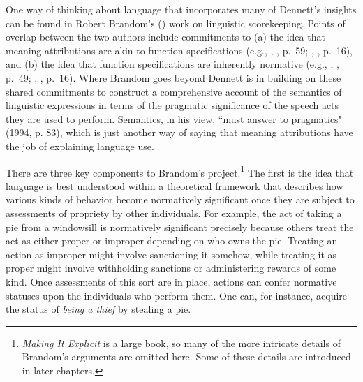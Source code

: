 One way of thinking about language that incorporates many of Dennett's insights can be found in Robert Brandom's (\citeyear{Brandom:1994}) work on linguistic scorekeeping. Points of overlap between the two authors include commitments to (a) the idea that meaning attributions are akin to function specifications (e.g., \citeauthor{Dennett:1987}, \citeyear{Dennett:1987}, p.~59; \citeauthor{Brandom:1994}, \citeyear{Brandom:1994}, p.~16), and (b) the idea that function specifications are inherently normative (e.g., \citeauthor{Dennett:1987}, \citeyear{Dennett:1987}, p.~49; \citeauthor{Brandom:1994}, \citeyear{Brandom:1994}, p.~16). Where Brandom goes beyond Dennett is in building on these shared commitments to construct a comprehensive account of the semantics of linguistic expressions in terms of the pragmatic significance of the speech acts they are used to perform. Semantics, in his view, ``must answer to pragmatics" (1994, p. 83), which is just another way of saying that meaning attributions have the job of explaining language use. 

There are three key components to Brandom's project.\footnote{\textit{Making It Explicit} is a large book, so many of the more intricate details of Brandom's arguments are omitted here. Some of these details are introduced in later chapters.} The first is the idea that language is best understood within a theoretical framework that describes how various kinds of behavior become normatively significant once they are subject to assessments of propriety by other individuals. For example, the act of taking a pie from a windowsill is normatively significant precisely because others treat the act as either proper or improper depending on who owns the pie. Treating an action as improper might involve sanctioning it somehow, while treating it as proper might involve withholding sanctions or administering rewards of some kind. Once assessments of this sort are in place, actions can confer normative statuses upon the individuals who perform them. One can, for instance, acquire the status of \textit{being a thief} by stealing a pie. 

